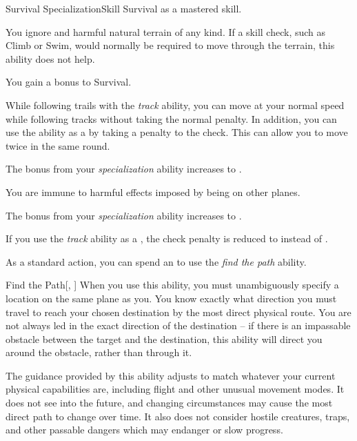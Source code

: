     \begin{feat}{Survival Specialization}{Skill}
        \featpre Survival as a mastered skill.

         You ignore  and harmful natural terrain of any kind.
        If a skill check, such as Climb or Swim, would normally be required to move through the terrain, this ability does not help.

         You gain a  bonus to Survival.

        While following trails with the \textit{track} ability, you can move at your normal speed while following tracks without taking the normal  penalty.
        In addition, you can use the ability as a  by taking a  penalty to the check.
        This can allow you to move twice in the same round.

         The bonus from your \textit{specialization} ability increases to .

         You are immune to harmful effects imposed by being on other planes.

         The bonus from your \textit{specialization} ability increases to .

         If you use the \textit{track} ability as a , the check penalty is reduced to  instead of .

         As a standard action, you can spend an  to use the \textit{find the path} ability.
        \begin{ability}{Find the Path}[, ]
            When you use this ability, you must unambiguously specify a location on the same plane as you.
            You know exactly what direction you must travel to reach your chosen destination by the most direct physical route.
            You are not always led in the exact direction of the destination -- if there is an impassable obstacle between the target and the destination, this ability will direct you around the obstacle, rather than through it.

            The guidance provided by this ability adjusts to match whatever your current physical capabilities are, including flight and other unusual movement modes. It does not see into the future, and changing circumstances may cause the most direct path to change over time.
            It also does not consider hostile creatures, traps, and other passable dangers which may endanger or slow progress.
        \end{ability}
    \end{feat}

